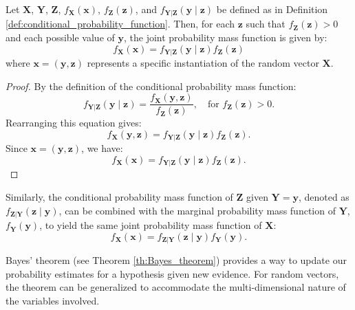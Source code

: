 \begin{proposition}
Let \( \mathbf{X} \), \( \mathbf{Y} \), \( \mathbf{Z} \), \( f_{\mathbf{X}}(\mathbf{x}) \), \( f_{\mathbf{Z}}(\mathbf{z}) \), and \( f_{\mathbf{Y}|\mathbf{Z}}(\mathbf{y} \mid \mathbf{z}) \) be defined as in Definition \ref{def:conditional_probability_function}. Then, for each \( \mathbf{z} \) such that \( f_{\mathbf{Z}}(\mathbf{z}) > 0 \) and each possible value of \( \mathbf{y} \), the joint probability mass function is given by:
\[
f_{\mathbf{X}}(\mathbf{x}) = f_{\mathbf{Y}|\mathbf{Z}}(\mathbf{y} \mid \mathbf{z}) f_{\mathbf{Z}}(\mathbf{z})
\]
where \( \mathbf{x} = (\mathbf{y}, \mathbf{z}) \) represents a specific instantiation of the random vector \( \mathbf{X} \).
\end{proposition}
\begin{proof}
By the definition of the conditional probability mass function:
\[
f_{\mathbf{Y}|\mathbf{Z}}(\mathbf{y} \mid \mathbf{z}) = \frac{f_{\mathbf{X}}(\mathbf{y}, \mathbf{z})}{f_{\mathbf{Z}}(\mathbf{z})}, \quad \text{for } f_{\mathbf{Z}}(\mathbf{z}) > 0.
\]
Rearranging this equation gives:
\[
f_{\mathbf{X}}(\mathbf{y}, \mathbf{z}) = f_{\mathbf{Y}|\mathbf{Z}}(\mathbf{y} \mid \mathbf{z}) f_{\mathbf{Z}}(\mathbf{z}).
\]
Since \( \mathbf{x} = (\mathbf{y}, \mathbf{z}) \), we have:
\[
f_{\mathbf{X}}(\mathbf{x}) = f_{\mathbf{Y}|\mathbf{Z}}(\mathbf{y} \mid \mathbf{z}) f_{\mathbf{Z}}(\mathbf{z}).
\]
\end{proof}

Similarly, the conditional probability mass function of \( \mathbf{Z} \) given \( \mathbf{Y} = \mathbf{y} \), denoted as \( f_{\mathbf{Z}|\mathbf{Y}}(\mathbf{z} \mid \mathbf{y}) \), can be combined with the marginal probability mass function of \( \mathbf{Y} \), \( f_{\mathbf{Y}}(\mathbf{y}) \), to yield the same joint probability mass function of \( \mathbf{X} \):
\[
f_{\mathbf{X}}(\mathbf{x}) = f_{\mathbf{Z}|\mathbf{Y}}(\mathbf{z} \mid \mathbf{y}) f_{\mathbf{Y}}(\mathbf{y}).
\]

Bayes' theorem (see Theorem \ref{th:Bayes_theorem}) provides a way to update our probability estimates for a hypothesis given new evidence. For random vectors, the theorem can be generalized to accommodate the multi-dimensional nature of the variables involved. 

